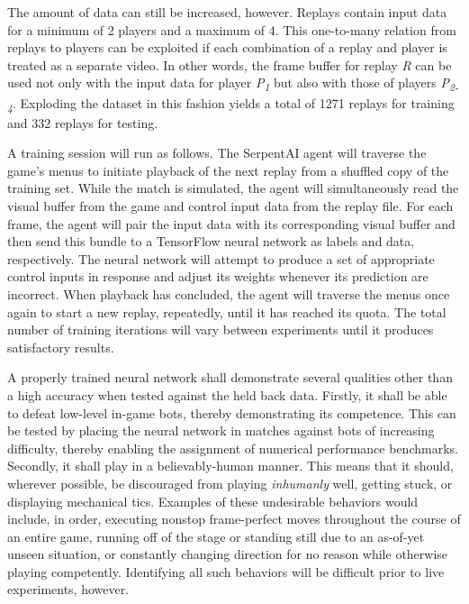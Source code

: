 The amount of data can still be increased, however. Replays contain input data for a minimum of 2 players and a maximum of 4. This one-to-many relation from replays to players can be exploited if each combination of a replay and player is treated as a separate video. In other words, the frame buffer for replay \textit{R} can be used not only with the input data for player \textit{\textit{P\textsubscript{1}}} but also with those of players \textit{P\textsubscript{2-4}}. Exploding the dataset in this fashion yields a total of 1271 replays for training and 332 replays for testing. 

A training session will run as follows. The SerpentAI agent will traverse the game's menus to initiate playback of the next replay from a shuffled copy of the training set. While the match is simulated, the agent will simultaneously read the visual buffer from the game and control input data from the replay file. For each frame, the agent will pair the input data with its corresponding visual buffer and then send this bundle to a TensorFlow neural network as labels and data, respectively. The neural network will attempt to produce a set of appropriate control inputs in response and adjust its weights  whenever its prediction are incorrect. When playback has concluded, the agent will traverse the menus once again to start a new replay, repeatedly, until it has reached its quota. The total number of training iterations will vary between experiments until it produces satisfactory results.

A properly trained neural network shall demonstrate several qualities other than a high accuracy when tested against the held back data. Firstly, it shall be able to defeat low-level in-game bots, thereby demonstrating its competence. This can be tested by placing the neural network in matches against bots of increasing difficulty, thereby enabling the assignment of numerical performance benchmarks. Secondly, it shall play in a believably-human manner. This means that it should, wherever possible, be discouraged from playing {\it inhumanly} well, getting stuck, or displaying mechanical tics. Examples of these undesirable behaviors would include, in order, executing nonstop frame-perfect moves throughout the course of an entire game, running off of the stage or standing still due to an as-of-yet unseen situation, or constantly changing direction for no reason while otherwise playing competently. Identifying all such behaviors will be difficult prior to live experiments, however.

